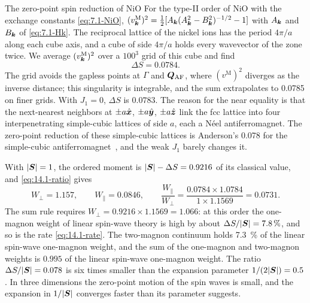 \begin{workedexample}{The zero-point spin reduction of NiO}\label{we:14-nio}
For the type-II order of NiO with the exchange constants \cref{eq:7.1-NiO}, $(v^{\mathrm{M}}_{\bm{k}})^2 = \frac12[A_{\bm{k}}(A_{\bm{k}}^2 - B_{\bm{k}}^2)^{-1/2} - 1]$ with $A_{\bm{k}}$ and $B_{\bm{k}}$ of \cref{eq:7.1-Hk}. The reciprocal lattice of the nickel ions has the period $4\pi/a$ along each cube axis, and a cube of side $4\pi/a$ holds every wavevector of the zone twice. We average $(v^{\mathrm{M}}_{\bm{k}})^2$ over a $100^3$ grid of this cube and find
\begin{equation*}
  \Delta S = 0.0784 .
\end{equation*}
The grid avoids the gapless points at $\Gamma$ and $\bm{Q}_{\mathrm{AF}}$, where $(v^{\mathrm{M}})^2$ diverges as the inverse distance; this singularity is integrable, and the sum extrapolates to 0.0785 on finer grids. With $J_1 = 0$, $\Delta S$ is $0.0783$. The reason for the near equality is that the next-nearest neighbors at $\pm a\hat{\bm{x}}$, $\pm a\hat{\bm{y}}$, $\pm a\hat{\bm{z}}$ link the fcc lattice into four interpenetrating simple-cubic lattices of side $a$, each a Néel antiferromagnet. The zero-point reduction of these simple-cubic lattices is Anderson's 0.078 for the simple-cubic antiferromagnet~\cite{anderson1952approximate}, and the weak $J_1$ barely changes it.

With $|\bm{S}| = 1$, the ordered moment is $|\bm{S}| - \Delta S = 0.9216$ of its classical value, and \cref{eq:14.1-ratio} gives
\begin{equation*}
  W_\perp = 1.157, \qquad W_\parallel = 0.0846, \qquad \frac{W_\parallel}{W_\perp} = \frac{0.0784 \times 1.0784}{1 \times 1.1569} = 0.0731 .
\end{equation*}
The sum rule requires $W_\perp = 0.9216 \times 1.1569 = 1.066$: at this order the one-magnon weight of linear spin-wave theory is high by about $\Delta S/|\bm{S}| = \SI{7.8}{\percent}$, and so is the rate \cref{eq:14.1-rate}. The two-magnon continuum holds \SI{7.3}{\percent} of the linear spin-wave one-magnon weight, and the sum of the one-magnon and two-magnon weights is $0.995$ of the linear spin-wave one-magnon weight. The ratio $\Delta S/|\bm{S}| = 0.078$ is six times smaller than the expansion parameter $1/(2|\bm{S}|) = 0.5$. In three dimensions the zero-point motion of the spin waves is small, and the expansion in $1/|\bm{S}|$ converges faster than its parameter suggests.
\end{workedexample}


